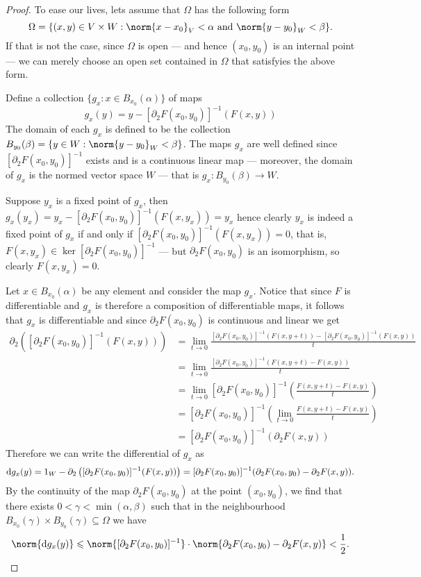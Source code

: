 \begin{proof}
  To ease our lives, lets assume that \(\Omega\) has the following form
  \[
    \Omega = \{(x, y) \in V \times W : \norm{x - x_{0}}_{V} < \alpha \text{ and } \norm{y - y_0}_W < \beta\}.
  \]
  If that is not the case, since \(\Omega\) is open --- and hence \((x_{0}, y_0)\) is
  an internal point --- we can merely choose an open set contained in \(\Omega\) that
  satisfyies the above form.

  Define a collection \(\{g_{x} : x \in B_{x_0}(\alpha)\}\) of maps
  \[
    g_{x}(y) = y - [\partial_2F(x_0, y_0)]^{-1} (F(x, y))
  \]
  The domain of each \(g_x\) is defined to be the collection \(B_{y_0}(\beta) = \{y
  \in W : \norm{y - y_0}_W < \beta\}\). The maps \(g_{x}\) are well defined since
  \([\partial_2F(x_0, y_0)]^{-1}\) exists and is a continuous linear map --- moreover, the
  domain of \(g_x\) is the normed vector space \(W\) --- that is \(g_x: B_{y_0}(\beta) \to
  W\).

  Suppose \(y_x\) is a fixed point of \(g_x\), then \(g_x(y_x) = y_x -
  [\partial_2F(x_0, y_0)]^{-1}(F(x, y_x)) = y_{x}\) hence clearly \(y_x\) is indeed a
  fixed point of \(g_x\) if and only if \([\partial_2F(x_0, y_0)]^{-1}(F(x, y_x)) =
  0\), that is, \(F(x, y_x) \in \ker [\partial_2F(x_0, y_0)]^{-1}\) --- but \(\partial_2 F(x_0,
  y_0)\) is an isomorphism, so clearly \(F(x, y_x) = 0\).

  Let \(x \in B_{x_0}(\alpha)\) be any element and consider the map \(g_x\). Notice
  that since \(F\) is differentiable and \(g_{x}\) is therefore a composition of
  differentiable maps, it follows that \(g_x\) is differentiable and since \(\partial_2
  F(x_0, y_0)\) is continuous and linear we get
  \begin{align*}
    \partial_2 \left( [\partial_2F(x_0, y_0)]^{-1}(F(x, y)) \right)
    &= \lim_{t \to 0} \frac{[\partial_{2}F(x_0, y_0)]^{-1}(F(x, y + t)) - [\partial_2F(x_0,
      y_0)]^{-1}(F(x, y))}{t}
    \\
    &= \lim_{t \to 0} \frac{[\partial_2F(x_0, y_{0})]^{-1}(F(x, y + t) - F(x, y))}{t}
    \\
    &= \lim_{t \to 0} [\partial_2F(x_0, y_0)]^{-1}
      \left( \frac{F(x, y + t) - F(x, y)}{t} \right)
    \\
    &= [\partial_2F(x_0, y_0)]^{-1}
      \left( \lim_{t \to 0} \frac{F(x, y + t) - F(x, y)}{t} \right)
    \\
    &= [\partial_{2}F(x_0, y_0)]^{-1}(\partial_2 F(x, y))
  \end{align*}
  Therefore we can write the differential of \(g_{x}\) as
  \[
    \mathrm{d} g_x(y) = 1_W - \partial_{2}\left([\partial_2F(x_0, y_0)]^{-1}(F(x, y))\right)
    = [\partial_2F(x_0, y_0)]^{-1}(\partial_2F(x_0, y_0) - \partial_2F(x, y)).
  \]
  By the continuity of the map \(\partial_2F(x_0, y_0)\) at the point \((x_0, y_0)\),
  we find that there exists \(0 < \gamma < \min(\alpha, \beta)\) such that in the neighbourhood
  \(B_{x_0}(\gamma) \times B_{y_0}(\gamma) \subseteq \Omega\) we have
  \[
    \norm{\diff g_x(y)} \leq \norm{[\partial_{2}F(x_0, y_0)]^{-1}} \cdot \norm{\partial_2F(x_0, y_0) -
      \partial_2F(x, y)} < \frac{1}{2}.
  \]


\end{proof}
